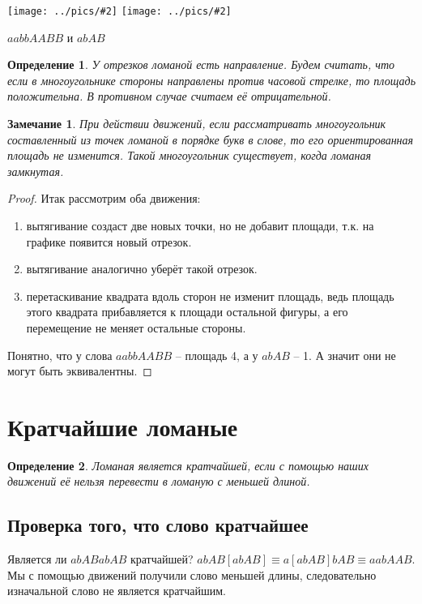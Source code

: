 \documentclass[12pt,a4paper, flushleft]{article}
\newtheorem{Def}{Определение}[section]
\newtheorem{Zm}{Замечание}[section]
\newcommand{\gr}[2]{\texttt{[image: ../pics/\#2]}}
\begin{document}
\begin{multicols}{2}
\gr{0.25}{aabbAABB} \gr{0.25}{abAB}\columnbreak

$aabbAABB$ и $abAB$

\begin{Def}
	У отрезков ломаной есть направление. Будем считать, что если в многоугольнике стороны направлены против часовой стрелке, то площадь положительна. В противном случае считаем её отрицательной.
\end{Def}

\end{multicols}
\begin{Zm}
При действии движений, если рассматривать многоугольник составленный из точек ломаной в порядке букв в слове, то его ориентированная площадь не изменится. Такой многоугольник существует, когда ломаная замкнутая.
\end{Zm}
\begin{proof}
Итак рассмотрим оба движения:
\begin{enumerate}
	\item вытягивание создаст две новых точки, но не добавит площади, т.к. на графике появится новый отрезок.
	\item вытягивание аналогично уберёт такой отрезок.
	\item перетаскивание квадрата вдоль сторон не изменит площадь, ведь площадь этого квадрата прибавляется к площади остальной фигуры, а его перемещение не меняет остальные стороны. 
\end{enumerate}

Понятно, что у слова $aabbAABB$ -- площадь 4, а у $abAB$ -- 1. А значит они не могут быть эквивалентны.
\end{proof}


\section{Кратчайшие ломаные}
\begin{Def}
	Ломаная является кратчайшей, если с помощью наших движений её нельзя перевести в ломаную с меньшей длиной.
\end{Def}

\subsection{Проверка того, что слово кратчайшее}
Является ли $abABabAB$ кратчайшей? $abAB[abAB] \equiv a[abAB]bAB\equiv aabAAB$. Мы с помощью движений получили слово меньшей длины, следовательно изначальной слово не является кратчайшим.
\end{document}
